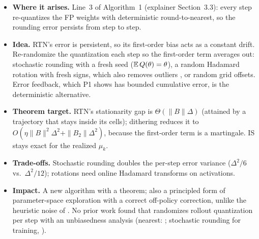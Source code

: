 \documentclass[11pt]{article}
\begin{document}
\begin{itemize}
\item \textbf{Where it arises.} Line~3 of Algorithm~1 (explainer Section~3.3): every step re-quantizes the FP weights with deterministic round-to-nearest, so the rounding error persists from step to step.
\item \textbf{Idea.} RTN's error is persistent, so its first-order bias acts as a constant drift. Re-randomize the quantization each step so the first-order term averages out: stochastic rounding with a fresh seed ($\mathbb{E}\,Q(\theta)=\theta$), a random Hadamard rotation with fresh signs, which also removes outliers \citep{ashkboos2024quarot}, or random grid offsets. Error feedback, which P1 shows has bounded cumulative error, is the deterministic alternative.
\item \textbf{Theorem target.} RTN's stationarity gap is $\Theta(\|B\|\Delta)$ (attained by a trajectory that stays inside its cells); dithering reduces it to $O(\eta\|B\|^2\Delta^2+\|B_2\|\Delta^2)$, because the first-order term is a martingale. IS stays exact for the realized $\mu_k$.
\item \textbf{Trade-offs.} Stochastic rounding doubles the per-step error variance ($\Delta^2/6$ vs.\ $\Delta^2/12$); rotations need online Hadamard transforms on activations.
\item \textbf{Impact.} A new algorithm with a theorem; also a principled form of parameter-space exploration \citep{plappert2018parameter,fortunato2018noisy} with a correct off-policy correction, unlike the heuristic noise of \citet{huang2025qerl}. No prior work found that randomizes rollout quantization per step with an unbiasedness analysis (nearest: \citealp{wang2026trace}; stochastic rounding for training, \citealp{ozkara2025stochastic}).
\end{itemize}
\end{document}
